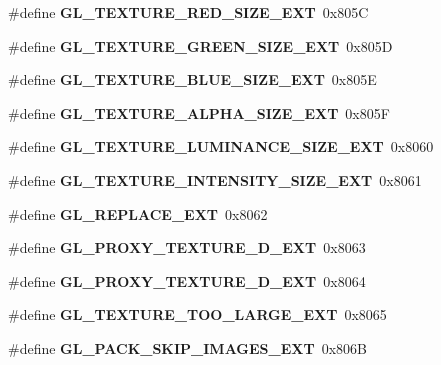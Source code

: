 \begin{DoxyCompactItemize}
\item 
\#define {\bfseries G\+L\+\_\+\+T\+E\+X\+T\+U\+R\+E\+\_\+\+R\+E\+D\+\_\+\+S\+I\+Z\+E\+\_\+\+E\+X\+T}~0x805\+C\label{_s_d_l__opengl_8h_ace566ddf2214472331eae346896e83cf}

\item 
\#define {\bfseries G\+L\+\_\+\+T\+E\+X\+T\+U\+R\+E\+\_\+\+G\+R\+E\+E\+N\+\_\+\+S\+I\+Z\+E\+\_\+\+E\+X\+T}~0x805\+D\label{_s_d_l__opengl_8h_a6557cfa5f4e56569fb6cd3eac7163cbe}

\item 
\#define {\bfseries G\+L\+\_\+\+T\+E\+X\+T\+U\+R\+E\+\_\+\+B\+L\+U\+E\+\_\+\+S\+I\+Z\+E\+\_\+\+E\+X\+T}~0x805\+E\label{_s_d_l__opengl_8h_a59b5314092b639d3bb8a8ef14df5248d}

\item 
\#define {\bfseries G\+L\+\_\+\+T\+E\+X\+T\+U\+R\+E\+\_\+\+A\+L\+P\+H\+A\+\_\+\+S\+I\+Z\+E\+\_\+\+E\+X\+T}~0x805\+F\label{_s_d_l__opengl_8h_a33698dacfd072ed95ae3e5fb3556d8ec}

\item 
\#define {\bfseries G\+L\+\_\+\+T\+E\+X\+T\+U\+R\+E\+\_\+\+L\+U\+M\+I\+N\+A\+N\+C\+E\+\_\+\+S\+I\+Z\+E\+\_\+\+E\+X\+T}~0x8060\label{_s_d_l__opengl_8h_a34e4d08be9b2a7e726cd205fbbc045da}

\item 
\#define {\bfseries G\+L\+\_\+\+T\+E\+X\+T\+U\+R\+E\+\_\+\+I\+N\+T\+E\+N\+S\+I\+T\+Y\+\_\+\+S\+I\+Z\+E\+\_\+\+E\+X\+T}~0x8061\label{_s_d_l__opengl_8h_ac3551932d44ce11eb20c280a3f143653}

\item 
\#define {\bfseries G\+L\+\_\+\+R\+E\+P\+L\+A\+C\+E\+\_\+\+E\+X\+T}~0x8062\label{_s_d_l__opengl_8h_af5fdcd50ac129c0392396f3487329fd3}

\item 
\#define {\bfseries G\+L\+\_\+\+P\+R\+O\+X\+Y\+\_\+\+T\+E\+X\+T\+U\+R\+E\+\_\+D\+\_\+\+E\+X\+T}~0x8063\label{_s_d_l__opengl_8h_a0f7b8078d91d963dbc06f91eccea89de}

\item 
\#define {\bfseries G\+L\+\_\+\+P\+R\+O\+X\+Y\+\_\+\+T\+E\+X\+T\+U\+R\+E\+\_\+D\+\_\+\+E\+X\+T}~0x8064\label{_s_d_l__opengl_8h_a6c3e3c1d45877ca8a0042652d67d02e9}

\item 
\#define {\bfseries G\+L\+\_\+\+T\+E\+X\+T\+U\+R\+E\+\_\+\+T\+O\+O\+\_\+\+L\+A\+R\+G\+E\+\_\+\+E\+X\+T}~0x8065\label{_s_d_l__opengl_8h_a3b7d50f04a14942a9056c72d66861fe0}

\item 
\#define {\bfseries G\+L\+\_\+\+P\+A\+C\+K\+\_\+\+S\+K\+I\+P\+\_\+\+I\+M\+A\+G\+E\+S\+\_\+\+E\+X\+T}~0x806\+B\label{_s_d_l__opengl_8h_a338f4a855bcfc0703e6c4d21ebc55a93}


\end{DoxyCompactItemize}
